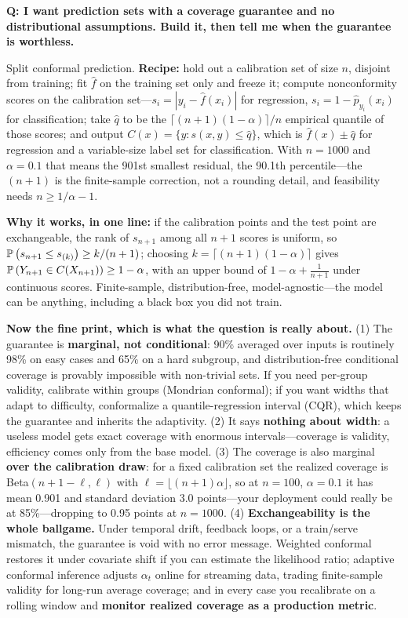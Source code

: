\begin{interviewq}
\textbf{Q: I want prediction sets with a coverage guarantee and no distributional assumptions. Build it, then tell me when the guarantee is worthless.}

 \quad {} \quad \badgefreq{\freqmed}

\stronganswer

Split conformal prediction. \textbf{Recipe:} hold out a calibration set of size $n$, disjoint from training; fit $\hat f$ on the training set only and freeze it; compute nonconformity scores on the calibration set---$s_i = |y_i - \hat f(x_i)|$ for regression, $s_i = 1 - \hat p_{y_i}(x_i)$ for classification; take $\hat q$ to be the $\lceil (n+1)(1-\alpha)\rceil/n$ empirical quantile of those scores; and output $C(x) = \{y : s(x,y) \le \hat q\}$, which is $\hat f(x) \pm \hat q$ for regression and a variable-size label set for classification. With $n = 1000$ and $\alpha = 0.1$ that means the 901st smallest residual, the 90.1th percentile---the $(n+1)$ is the finite-sample correction, not a rounding detail, and feasibility needs $n \ge 1/\alpha - 1$.

\textbf{Why it works, in one line:} if the calibration points and the test point are exchangeable, the rank of $s_{n+1}$ among all $n+1$ scores is uniform, so $\mathbb{P}\left(s_{n+1} \le s_{(k)}\right) \ge k/(n+1)$; choosing $k = \lceil (n+1)(1-\alpha)\rceil$ gives $\mathbb{P}\left(Y_{n+1} \in C(X_{n+1})\right) \ge 1-\alpha$, with an upper bound of $1-\alpha+\tfrac{1}{n+1}$ under continuous scores. Finite-sample, distribution-free, model-agnostic---the model can be anything, including a black box you did not train.

\textbf{Now the fine print, which is what the question is really about.} (1) The guarantee is \textbf{marginal, not conditional}: 90\% averaged over inputs is routinely 98\% on easy cases and 65\% on a hard subgroup, and distribution-free conditional coverage is provably impossible with non-trivial sets. If you need per-group validity, calibrate within groups (Mondrian conformal); if you want widths that adapt to difficulty, conformalize a quantile-regression interval (CQR), which keeps the guarantee and inherits the adaptivity. (2) It says \textbf{nothing about width}: a useless model gets exact coverage with enormous intervals---coverage is validity, efficiency comes only from the base model. (3) The coverage is also marginal \textbf{over the calibration draw}: for a fixed calibration set the realized coverage is Beta$(n+1-\ell,\ell)$ with $\ell = \lfloor(n+1)\alpha\rfloor$, so at $n = 100$, $\alpha = 0.1$ it has mean 0.901 and standard deviation 3.0 points---your deployment could really be at 85\%---dropping to 0.95 points at $n = 1000$. (4) \textbf{Exchangeability is the whole ballgame.} Under temporal drift, feedback loops, or a train/serve mismatch, the guarantee is void with no error message. Weighted conformal restores it under covariate shift if you can estimate the likelihood ratio; adaptive conformal inference adjusts $\alpha_t$ online for streaming data, trading finite-sample validity for long-run average coverage; and in every case you recalibrate on a rolling window and \textbf{monitor realized coverage as a production metric}.


\end{interviewq}

